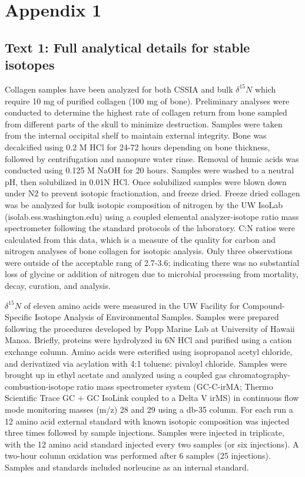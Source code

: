 \documentclass [11pt, proquest] {uwthesis}[2015/03/03]
\begin{document}
\appendix

\chapter{Appendix 1}\label{appendix-1}

\section{Text 1: Full analytical details for stable
isotopes}\label{text-1-full-analytical-details-for-stable-isotopes}

Collagen samples have been analyzed for both CSSIA and bulk
\(\delta^{15}N\) which require 10 mg of purified collagen (100 mg of
bone). Preliminary analyses were conducted to determine the highest rate
of collagen return from bone sampled from different parts of the skull
to minimize destruction. Samples were taken from the internal occipital
shelf to maintain external integrity. Bone was decalcified using 0.2 M
HCl for 24-72 hours depending on bone thickness, followed by
centrifugation and nanopure water rinse. Removal of humic acids was
conducted using 0.125 M NaOH for 20 hours. Samples were washed to a
neutral pH, then solubilized in 0.01N HCl. Once solubilized samples were
blown down under N2 to prevent isotopic fractionation, and freeze dried.
Freeze dried collagen was be analyzed for bulk isotopic composition of
nitrogen by the UW IsoLab (isolab.ess.washington.edu) using a coupled
elemental analyzer-isotope ratio mass spectrometer following the
standard protocols of the laboratory. C:N ratios were calculated from
this data, which is a measure of the quality for carbon and nitrogen
analyses of bone collagen for isotopic analysis. Only three observations
were outside of the acceptable rang of 2.7-3.6; indicating there was no
substantial loss of glycine or addition of nitrogen due to microbial
processing from mortality, decay, curation, and analysis.

\(\delta^{15}N\) of eleven amino acids were measured in the UW Facility
for Compound-Specific Isotope Analysis of Environmental Samples. Samples
were prepared following the procedures developed by Popp Marine Lab at
University of Hawaii Manoa. Briefly, proteins were hydrolyzed in 6N HCl
and purified using a cation exchange column. Amino acids were esterified
using isopropanol acetyl chloride, and derivatized via acylation with
4:1 toluene: pivaloyl chloride. Samples were brought up in ethyl acetate
and analyzed using a coupled gas chromatography-combustion-isotope ratio
mass spectrometer system (GC-C-irMA; Thermo Scientific Trace GC + GC
IsoLink coupled to a Delta V irMS) in continuous flow mode monitoring
masses (m/z) 28 and 29 using a db-35 column. For each run a 12 amino
acid external standard with known isotopic composition was injected
three times followed by sample injections. Samples were injected in
triplicate, with the 12 amino acid standard injected every two samples
(or six injections). A two-hour column oxidation was performed after 6
samples (25 injections). Samples and standards included norleucine as an
internal standard.
\end{document}
